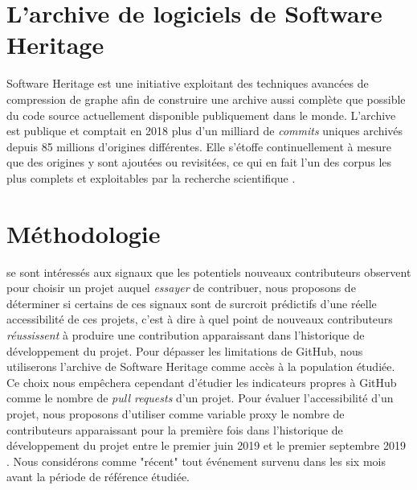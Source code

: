 \documentclass[dvipsnames,runningheads]{llncs}
\newcommand{\en}[1]{\foreignlanguage{english}{\emph{#1}}}
\newtheorem{hypo}{Hypothèse}[theorem]
\begin{document}
    \section{L'archive de logiciels de Software Heritage}

    \label{ssec:swh-graph}

    Software Heritage est une initiative exploitant des techniques avancées de compression de graphe afin de
    construire une archive aussi complète que possible du code source actuellement disponible publiquement
    dans le monde. L'archive est publique et comptait en 2018 plus d'un milliard de \en{commits} uniques
    archivés depuis 85 millions d'origines différentes. Elle s'étoffe continuellement à mesure que des
    origines y sont ajoutées ou revisitées, ce qui en fait l'un des corpus les plus complets et exploitables
    par la recherche scientifique \parencite{swh-2019,swh-growth-2019}.

    \section{Méthodologie}

    \textcite{signals-2019} se sont intéressés aux signaux que les potentiels nouveaux contributeurs observent
    pour choisir un projet auquel \emph{essayer} de contribuer, nous proposons de déterminer si certains de
    ces signaux sont de surcroit prédictifs d'une réelle accessibilité de ces projets, c'est à dire à quel
    point de nouveaux contributeurs \emph{réussissent} à produire une contribution apparaissant dans
    l'historique de développement du projet. Pour dépasser les limitations de GitHub, nous utiliserons
    l'archive de Software Heritage comme accès à la population étudiée. Ce choix nous empêchera cependant
    d'étudier les indicateurs propres à GitHub comme le nombre de \en{pull requests} d'un projet. Pour évaluer
    l'accessibilité d'un projet, nous proposons d'utiliser comme variable proxy le nombre de contributeurs
    apparaissant pour la première fois dans l'historique de développement du projet entre le premier juin 2019
    et le premier septembre 2019 \parencite{signals-2019}. Nous considérons comme "récent" tout événement
    survenu dans les six mois avant la période de référence étudiée.

    \newcommand{\newhyp}[2]{%
        \begin{hypo}
            \label{hyp:#1}: #2
        \end{hypo}%
    }
\end{document}
